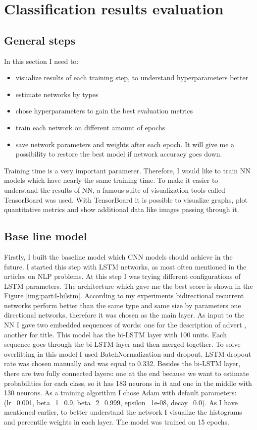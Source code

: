 \chapter{Classification results evaluation} \label{chapt4}

\section{General steps} \label{sect4_1}
\noindent
In this section I need to:
\begin{itemize}
	\item visualize results of each training step, to understand hyperparameters better
	\item estimate networks by types 
	\item chose hyperparameters to gain the best evaluation metrics  
	\item train each network on different amount of epochs
	\item save network parameters and weights after each epoch. It will give me a possibility to restore the best model if network accuracy goes down.
\end{itemize}

\noindent
Training time is a very important parameter. Therefore, I would like to train NN models which have nearly the same training time. To make it easier to understand the results of NN, a famous suite of visualization tools called TensorBoard was used. With TensorBoard it is possible to visualize graphs, plot quantitative metrics and show additional data like images passing through it.  


\section{Base line model} \label{sect4_2}

Firstly, I built the baseline model which CNN models should achieve in the future. I started this step with LSTM networks, as most often mentioned in the articles on NLP problems. At this step I was trying different configurations of LSTM parameters. The architecture which gave me the best score is shown in the Figure \ref{img:part4-bilstm}. According to my experiments bidirectional recurrent networks perform better than the same type and same size by parameters one directional networks, therefore it was chosen as the main layer. As input to the NN I gave two embedded sequences of words: one for the description of advert , another for title. This model has the bi-LSTM layer with 100 units. Each sequence goes through the bi-LSTM layer and then merged together. To solve overfitting in this model I used BatchNormalization and dropout. LSTM dropout rate was chosen manually and was equal to 0.332. Besides the bi-LSTM layer, there are two fully connected layers: one at the end because we want to estimate probabilities for each class, so it has 183 neurons in it and one in the middle with 130 neurons. As a training algorithm I chose Adam with default parameters: (lr=0.001, beta\_1=0.9, beta\_2=0.999, epsilon=1e-08, decay=0.0). As I have mentioned earlier, to better understand the network I visualize the histograms and percentile weights in each layer. The model was trained on 15 epochs.


